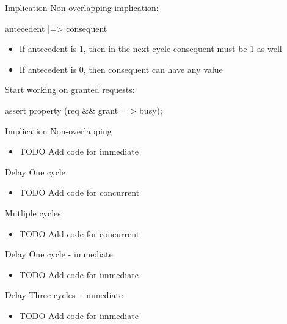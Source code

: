 \documentclass{beamer}
\begin{document}
\begin{frame}{Implication}
Non-overlapping implication:

\begin{semiverbatim}
antecedent |=> consequent
\end{semiverbatim}

\begin{itemize}
 \item If antecedent is 1, then in the next cycle consequent must be 1 as well
 \item If antecedent is 0, then consequent can have any value
\end{itemize}

\pause
Start working on granted requests:
\begin{semiverbatim}
assert property (req \&\& grant |=> busy);
\end{semiverbatim}
\end{frame}


\begin{frame}{Implication}
Non-overlapping

\begin{itemize}
 \item TODO Add code for immediate
\end{itemize}
\end{frame}


\begin{frame}{Delay}
One cycle

\begin{itemize}
 \item TODO Add code for concurrent
\end{itemize}

Mutliple cycles
\begin{itemize}
 \item TODO Add code for concurrent
\end{itemize}
\end{frame}


\begin{frame}{Delay}
One cycle - immediate

\begin{itemize}
 \item TODO Add code for immediate
\end{itemize}
\end{frame}


\begin{frame}{Delay}
Three cycles - immediate

\begin{itemize}
 \item TODO Add code for immediate
\end{itemize}
\end{frame}
\end{document}
